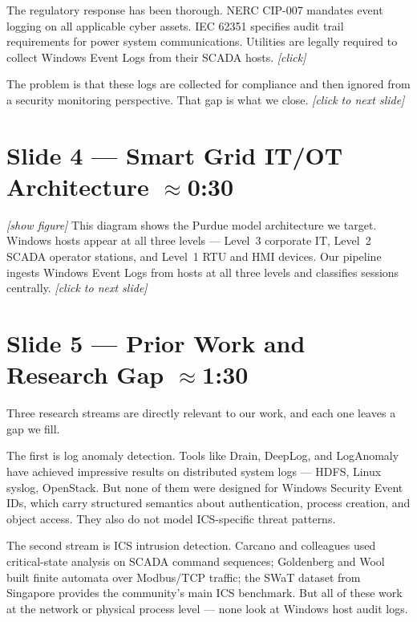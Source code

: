 \documentclass[14pt]{article}
\begin{document}
The regulatory response has been thorough. NERC CIP-007 mandates event logging on all applicable cyber assets. IEC 62351 specifies audit trail requirements for power system communications. Utilities are legally required to collect Windows Event Logs from their SCADA hosts. \textit{[click]}

The problem is that these logs are collected for compliance and then ignored from a security monitoring perspective. That gap is what we close. \textit{[click to next slide]}

\section*{Slide 4 — Smart Grid IT/OT Architecture \hfill \normalfont\small $\approx$0:30}

\textit{[show figure]} This diagram shows the Purdue model architecture we target. Windows hosts appear at all three levels --- Level~3 corporate IT, Level~2 SCADA operator stations, and Level~1 RTU and HMI devices. Our pipeline ingests Windows Event Logs from hosts at all three levels and classifies sessions centrally. \textit{[click to next slide]}

\section*{Slide 5 — Prior Work and Research Gap \hfill \normalfont\small $\approx$1:30}

Three research streams are directly relevant to our work, and each one leaves a gap we fill.

The first is log anomaly detection. Tools like Drain, DeepLog, and LogAnomaly have achieved impressive results on distributed system logs --- HDFS, Linux syslog, OpenStack. But none of them were designed for Windows Security Event IDs, which carry structured semantics about authentication, process creation, and object access. They also do not model ICS-specific threat patterns.

The second stream is ICS intrusion detection. Carcano and colleagues used critical-state analysis on SCADA command sequences; Goldenberg and Wool built finite automata over Modbus/TCP traffic; the SWaT dataset from Singapore provides the community's main ICS benchmark. But all of these work at the network or physical process level --- none look at Windows host audit logs.
\end{document}
